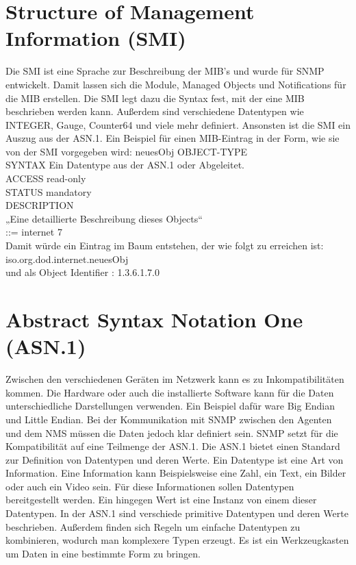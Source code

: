 \documentclass[11pt,a4paper]{article}
\begin{document}
\section*{Structure of Management Information (SMI)}
Die SMI ist eine Sprache zur Beschreibung der MIB’s und wurde für SNMP entwickelt. Damit lassen sich die Module, Managed Objects und Notifications für die MIB erstellen. Die SMI legt dazu die Syntax fest, mit der eine MIB beschrieben werden kann. Außerdem sind verschiedene Datentypen wie INTEGER, Gauge, Counter64 und viele mehr definiert. Ansonsten ist die SMI ein Auszug aus der ASN.1.
Ein Beispiel für einen MIB-Eintrag in der Form, wie sie von der SMI vorgegeben wird:
\linebreak
\color{red}
neuesObj OBJECT-TYPE\\
		SYNTAX Ein Datentype aus der ASN.1 oder Abgeleitet.\\
		ACCESS read-only\\
		STATUS mandatory\\
		DESCRIPTION\\
			„Eine detaillierte Beschreibung dieses Objects“\\
		::= { internet 7 }\\
\color{black}
Damit würde ein Eintrag im Baum entstehen, der  wie folgt zu erreichen ist: iso.org.dod.internet.neuesObj\\
und als Object Identifier : 1.3.6.1.7.0

\section*{Abstract Syntax Notation One (ASN.1)}
Zwischen den verschiedenen Geräten im Netzwerk kann es zu Inkompatibilitäten kommen. Die Hardware oder auch die installierte Software kann für die Daten unterschiedliche Darstellungen verwenden. Ein Beispiel dafür ware Big Endian und Little Endian. Bei der Kommunikation mit SNMP zwischen den Agenten und dem NMS müssen die Daten jedoch klar definiert sein. SNMP setzt für die Kompatibilität auf eine Teilmenge der ASN.1.
Die ASN.1 bietet einen Standard zur Definition von Datentypen und deren Werte. Ein Datentype ist eine Art von Information. Eine Information kann Beispielsweise eine Zahl, ein Text, ein Bilder oder auch ein Video sein. Für diese Informationen sollen Datentypen bereitgestellt werden. Ein hingegen Wert ist eine Instanz von einem dieser Datentypen. In der ASN.1 sind verschiede primitive Datentypen und deren Werte beschrieben. Außerdem finden sich Regeln um einfache Datentypen zu kombinieren, wodurch man komplexere Typen erzeugt. Es ist ein Werkzeugkasten um Daten in eine bestimmte  Form zu bringen.
\linebreak
\end{document}
